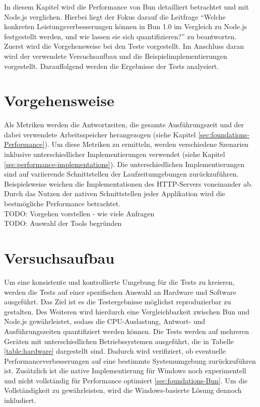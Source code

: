   \label{performanceAnalysis}
In diesem Kapitel wird die Performance von Bun detailliert betrachtet und mit Node.js verglichen. Hierbei liegt der Fokus darauf die Leitfrage ``Welche konkreten Leistungsverbesserungen können in Bun 1.0 im Vergleich zu Node.js festgestellt werden, und wie lassen sie sich quantifizieren?'' zu beantworten. Zuerst wird die Vorgehensweise bei den Teste vorgestellt. Im Anschluss daran wird der verwendete Versuchsaufbau und die Beispielimplementierungen vorgestellt. Darauffolgend werden die Ergebnisse der Tests analysiert.

\section{Vorgehensweise} \label{sec:performance-approach}
Als Metriken werden die Antwortzeiten, die gesamte Ausführungszeit und der dabei verwendete Arbeitsspeicher herangezogen (siehe Kapitel \ref{sec:foundations-Performance}). Um diese Metriken zu ermitteln, werden verschiedene Szenarien inklusive unterschiedlicher Implementierungen verwendet (siehe Kapitel \ref{sec:performance-implementations}). Die unterschiedlichen Implementierungen sind auf variierende Schnittstellen der Laufzeitumgebungen zurückzuführen. Beispielsweise weichen die Implementationen des HTTP-Servers voneinander ab. Durch das Nutzen der nativen Schnittstellen jeder Applikation wird die bestmögliche Performance betrachtet.  \\

\noindent
TODO: Vorgehen vorstellen - wie viele Anfragen\\

\noindent
TODO: Auswahl der Tools begründen

\section{Versuchsaufbau} \label{sec:performance-testSetup}
Um eine konsistente und kontrollierte Umgebung für die Tests zu kreieren, werden die Tests auf einer spezifischen Auswahl an Hardware und Software ausgeführt. Das Ziel ist es die Testergebnisse möglichst reproduzierbar zu gestalten. Des Weiteren wird hierdurch eine Vergleichbarkeit zwischen Bun und Node.js gewährleistet, sodass die CPU-Auslastung, Antwort- und Ausführungszeiten quantifiziert werden können.\newline
Die Tests werden auf mehreren Geräten mit unterschiedlichen Betriebssystemen ausgeführt, die in Tabelle \ref{table:hardware} dargestellt sind. Dadurch wird verifiziert, ob eventuelle Performanceverbesserungen auf eine bestimmte Systemumgebung zurückzuführen ist. Zusätzlich ist die native Implementierung für Windows noch experimentell und nicht vollständig für Performance optimiert \ref{sec:foundations-Bun}. Um die Vollständigkeit zu gewährleisten, wird die Windows-basierte Lösung dennoch inkludiert.\\


